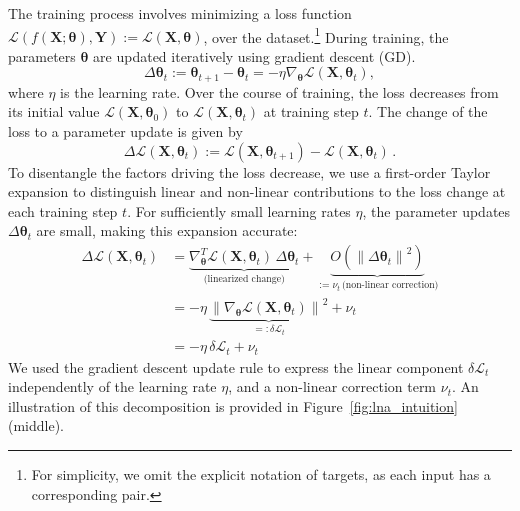 The training process involves minimizing a loss function \(\mathcal{L}(f(\mathbf{X}; \boldsymbol{\theta}), \mathbf{Y}) := \mathcal{L}(\mathbf{X}, \boldsymbol{\theta})\), over the dataset.\footnote{For simplicity, we omit the explicit notation of targets, as each input has a corresponding pair.}
During training, the parameters \(\boldsymbol{\theta}\) are updated iteratively using gradient descent (GD).
\begin{equation}
\Delta \boldsymbol{\theta}_t := \boldsymbol{\theta}_{t+1} - \boldsymbol{\theta}_t =  - \eta \nabla_{\boldsymbol{\theta}} \mathcal{L}(\mathbf{X}, \boldsymbol{\theta}_t),
\end{equation}
where \(\eta\) is the learning rate. 
Over the course of training, the loss decreases from its initial value \(\mathcal{L}(\mathbf{X}, \boldsymbol{\theta}_0)\) to \(\mathcal{L}(\mathbf{X}, \boldsymbol{\theta}_t)\) at training step \(t\).
The change of the loss to a parameter update is given by
\begin{equation}
    \Delta \mathcal{L}(\mathbf{X}, \boldsymbol{\theta}_t) := \mathcal{L}(\mathbf{X}, \boldsymbol{\theta}_{t+1}) - \mathcal{L}(\mathbf{X}, \boldsymbol{\theta}_t) \, .
    \label{eq:loss_change_def}
\end{equation}
To disentangle the factors driving the loss decrease, we use a first-order Taylor expansion to distinguish linear and non-linear contributions to the loss change at each training step \(t\).
For sufficiently small learning rates \(\eta\), the parameter updates \(\Delta \boldsymbol{\theta}_t\) are small, making this expansion accurate:
\begin{equation}
\begin{split}
    \Delta \mathcal{L}(\mathbf{X}, \boldsymbol{\theta}_t) 
    &= \underbrace{\nabla^T_{\boldsymbol{\theta}} \mathcal{L}(\mathbf{X}, \boldsymbol{\theta}_t) \, \Delta \boldsymbol{\theta}_t}_{\text{(linearized change)}}
    + \underbrace{O\!\left(\left\|\Delta \boldsymbol{\theta}_t\right\|^2\right)}_{:=\nu_t \, \text{(non-linear correction)}} \\
    &= -\eta \, \underbrace{\left\| \nabla_{\boldsymbol{\theta}} \mathcal{L}(\mathbf{X}, \boldsymbol{\theta}_t) \right\|^2}_{=:\delta \mathcal{L}_t} + \nu_t \\
    &= -\eta \, \delta \mathcal{L}_t + \nu_t \, 
    \label{eq:linear_response}
\end{split}
\end{equation}
We used the gradient descent update rule to express the linear component \(\delta \mathcal{L}_t\) independently of the learning rate \(\eta\), and a non-linear correction term \(\nu_t\). An illustration of this decomposition is provided in Figure~\ref{fig:lna_intuition} (middle).

